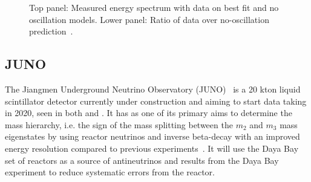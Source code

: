 \begin{figure}[h!]
\begin{minipage}[b]{0.49\textwidth}
       \vspace{2mm}
    \caption{Top panel: Measured energy spectrum with data on best fit and no oscillation models. Lower panel: Ratio of data over no-oscillation prediction~\cite{72Double}.}
     \label{fig:dc2}
  \end{minipage}
\end{figure}

\subsection{JUNO}

The Jiangmen Underground Neutrino Observatory (JUNO)~\cite{75Juno} is a 20 kton liquid scintillator detector currently under construction and aiming to start data taking in 2020, seen in both  and . It has as one of its primary aims to determine the mass hierarchy, i.e. the sign of the mass splitting between the $m_2$ and $m_3$ mass eigenstates by using reactor neutrinos and inverse beta-decay with an improved energy resolution compared to previous experiments~\cite{75Juno}. It will use the Daya Bay set of reactors as a source of antineutrinos and results from the Daya Bay experiment to reduce systematic errors from the reactor.

